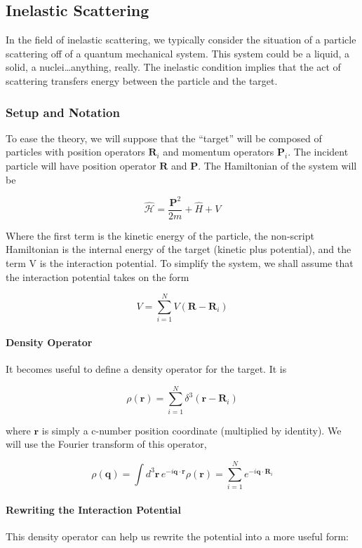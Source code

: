 \documentclass{article}
\begin{document}
			\subsection{Inelastic Scattering}
			In the field of inelastic scattering, we typically consider the situation of a particle scattering off of a quantum mechanical system. This system could be a liquid, a solid, a nuclei\ldots anything, really. The inelastic condition implies that the act of scattering transfers energy between the particle and the target. 
			
			\subsubsection{Setup and Notation} To ease the theory, we will suppose that the ``target'' will be composed of particles with position operators $\mathbf{R}_i$ and momentum operators $\mathbf{P}_i$. The incident particle will have position operator $\mathbf{R}$ and $\mathbf{P}$. The Hamiltonian of the system will be
			
			$$\hat{\mathscr{H}}=\frac{\mathbf{P}^2}{2m}+\hat{H}+V$$
			
			Where the first term is the kinetic energy of the particle, the non-script Hamiltonian is the internal energy of the target (kinetic plus potential), and the term V is the interaction potential. To simplify the system, we shall assume that the interaction potential takes on the form
			
			
			$$V=\sum_{i=1}^N V(\mathbf{R}-\mathbf{R}_i)$$
			
			
			\paragraph{Density Operator} It becomes useful to define a density operator for the target. It is
			
			
			$$\rho(\mathbf{r})=\sum_{i=1}^N \delta^3(\mathbf{r}-\mathbf{R}_i)$$
			
			
			where $\mathbf{r}$ is simply a c-number position coordinate (multiplied by identity). We will use the Fourier transform of this operator,
			
			
			$$\rho(\mathbf{q})=\int d^3\mathbf{r}\,e^{-i\mathbf{q}\cdot\mathbf{r}}\rho(\mathbf{r})=\sum_{i=1}^Ne^{-i\mathbf{q}\cdot\mathbf{R}_i}$$
			
			
			\paragraph{Rewriting the Interaction Potential} This density operator can help us rewrite the potential into a more useful form:
			
\end{document}
